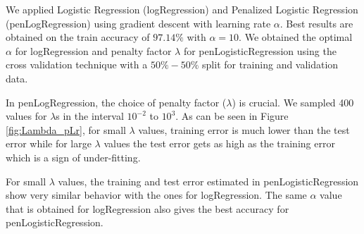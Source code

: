 We applied Logistic Regression (logRegression) and Penalized Logistic Regression (penLogRegression) using gradient descent with learning rate $\alpha$. Best results are obtained on the train accuracy of $97.14\%$ with $\alpha = 10$. We obtained the optimal $\alpha$ for logRegression   and penalty factor $\lambda$ for penLogisticRegression using the cross validation technique with a $50\%-50\%$ split for training and validation data.

In penLogRegression, the choice of penalty factor ($\lambda$) is crucial.  We sampled 400 values for $\lambda$s in the interval  $10^{-2}$ to $10^3$. As can be seen in Figure \ref{fig:Lambda_pLr}, for small $\lambda$ values, training error is much lower than the test error while for large $\lambda$ values the test error gets as high as the training error which is a sign of under-fitting. 

For small $\lambda$ values, the training and test error estimated in penLogisticRegression show very similar behavior with the ones for logRegression. The same $\alpha$ value that is obtained for logRegression  also gives the best accuracy for penLogisticRegression.

